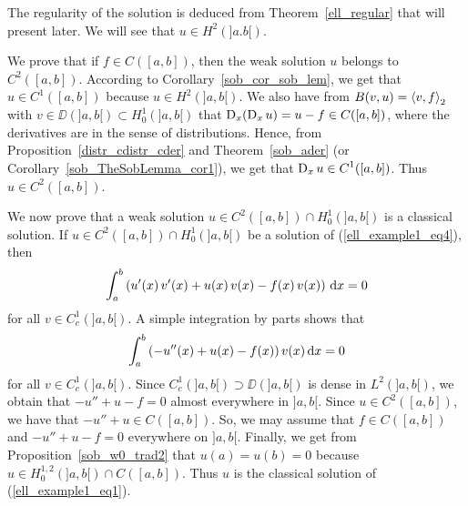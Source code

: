 \begin{egg}
The regularity of the solution is deduced from
Theorem~\ref{ell_regular} that will present later.  We will see
that $\displaystyle u\in H^2(]a.b[)$.

We prove that if $f \in C([a,b])$, then the weak solution $u$
belongs to $\displaystyle C^2([a,b])$.  According to
Corollary~\ref{sob_cor_sob_lem},
we get that $\displaystyle u \in C^1([a,b])$ because
$\displaystyle u\in H^2(]a,b[)$.  We also
have from $B(v,u)=\left\langle{v} , {f}\right\rangle_2$ with
$\displaystyle v\in \DD(]a,b[) \subset H^1_0(]a,b[)$
that $\operatorname{D}_x(\operatorname{D}_x u) = u - f \in C([a,b])$, where
the derivatives are in the sense of distributions.  Hence, from
Proposition~\ref{distr_cdistr_cder} and Theorem~\ref{sob_ader}
(or Corollary~\ref{sob_TheSobLemma_cor1}), we get that
$\displaystyle \operatorname{D}_x u \in C^1([a,b])$.
Thus $\displaystyle u\in C^2([a,b])$.

We now prove that a weak solution
$\displaystyle u \in C^2([a,b]) \cap H^1_0(]a,b[)$
is a classical solution.  If
$\displaystyle u \in C^2([a,b]) \cap H^1_0(]a,b[)$ be
a solution of (\ref{ell_example1_eq4}), then
\[
\int_a^b \left( u'(x)\,v'(x) + u(x)\, v(x) -f(x)\, v(x) \right) \,\mathrm{d}{x} = 0
\]
for all $\displaystyle v \in C^1_c(]a,b[)$.
A simple integration by parts shows that
\[
\int_a^b \left( -u''(x) + u(x) -f(x)\right) v(x) \,\mathrm{d}{x} = 0
\]
for all $\displaystyle v \in C^1_c(]a,b[)$.
Since $\displaystyle C^1_c(]a,b[) \supset \DD(]a,b[)$ is dense in
$\displaystyle L^2(]a,b[)$, we obtain that
$-u'' + u -f = 0$ almost everywhere in $]a,b[$.  Since
$\displaystyle u\in C^2([a,b])$, we have that 
$- u'' + u \in C([a,b])$.  So, we may assume that 
$f \in C([a,b])$ and $-u'' + u -f = 0$
everywhere on $]a,b[$.  Finally, we get from
Proposition~\ref{sob_w0_trad2} that $u(a)=u(b)= 0$ because
$\displaystyle u \in H^{1,2}_0(]a,b[) \cap C([a,b])$.  Thus $u$ is the classical
solution of (\ref{ell_example1_eq1}).
\end{egg}

